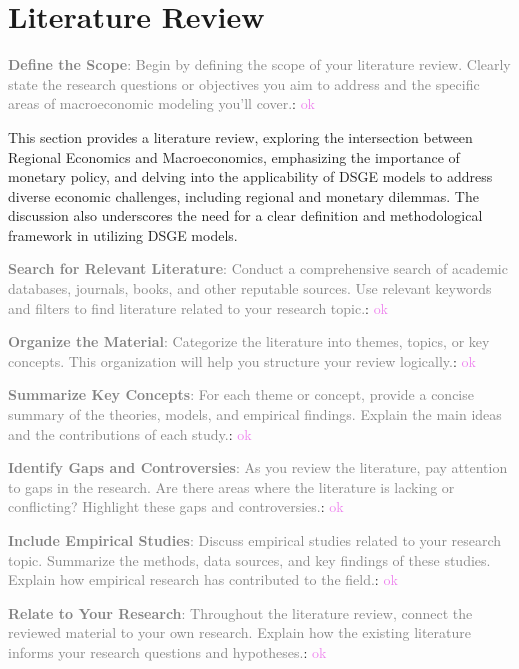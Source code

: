 \documentclass[../thesis.tex]{subfiles}
\begin{document}
	
	\newpage
	
	\section{Literature Review}\label{sec:literature-review}
	
	\textcolor{gray}{\textbf{Define the Scope}: Begin by defining the scope of your literature review. Clearly state the research questions or objectives you aim to address and the specific areas of macroeconomic modeling you'll cover.}: \textcolor{violet}{ok}
	
	This section provides a literature review, exploring the intersection between Regional Economics and Macroeconomics, emphasizing the importance of monetary policy, and delving into the applicability of DSGE models to address diverse economic challenges, including regional and monetary dilemmas. The discussion also underscores the need for a clear definition and methodological framework in utilizing DSGE models.
	
	\textcolor{gray}{\textbf{Search for Relevant Literature}: Conduct a comprehensive search of academic databases, journals, books, and other reputable sources. Use relevant keywords and filters to find literature related to your research topic.}: \textcolor{violet}{ok}
	
	\textcolor{gray}{\textbf{Organize the Material}: Categorize the literature into themes, topics, or key concepts. This organization will help you structure your review logically.}: \textcolor{violet}{ok}
	
	\textcolor{gray}{\textbf{Summarize Key Concepts}: For each theme or concept, provide a concise summary of the theories, models, and empirical findings. Explain the main ideas and the contributions of each study.}: \textcolor{violet}{ok}
	
	\textcolor{gray}{\textbf{Identify Gaps and Controversies}: As you review the literature, pay attention to gaps in the research. Are there areas where the literature is lacking or conflicting? Highlight these gaps and controversies.}: \textcolor{violet}{ok}
	
	\textcolor{gray}{\textbf{Include Empirical Studies}: Discuss empirical studies related to your research topic. Summarize the methods, data sources, and key findings of these studies. Explain how empirical research has contributed to the field.}: \textcolor{violet}{ok}
	
	\textcolor{gray}{\textbf{Relate to Your Research}: Throughout the literature review, connect the reviewed material to your own research. Explain how the existing literature informs your research questions and hypotheses.}: \textcolor{violet}{ok}
\end{document}
